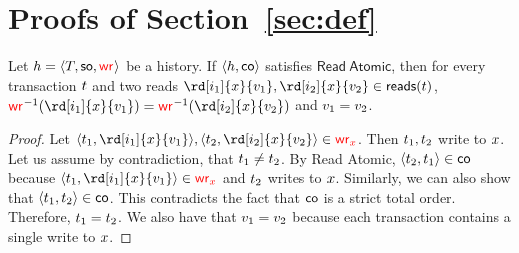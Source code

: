 
\section{Proofs of Section~\ref{sec:def}}\label{app:definitions}

\begin{lemma}
 Let ${h}={\left\langle{T, \mathsf{so}, \textcolor{red}{\mathsf{wr}_{}}}\right\rangle}$ be a history. 
 If ${\left\langle{{h},\mathsf{co}}\right\rangle}$ satisfies $\mathsf{Read\ Atomic}$, then %
 for every transaction ${t}$ and two reads $\rd[\id_1]{\xvar}{\val_1},\rd[\id_2]{\xvar}{\val_2}\in \readOp{\tr}$, $\wro^{-1}(\rd[\id_1]{\xvar}{\val_1})=\wro^{-1}(\rd[\id_2]{\xvar}{\val_2})$ and ${v}_1 = {v}_2$.\end{lemma}
\begin{proof}
 Let $\tup{\tr_1, \rd[\id_1]{\xvar}{\val_1}}, \tup{\tr_2, \rd[\id_2]{\xvar}{\val_2}} \in \wro[\xvar]$. Then ${t}_1, {t}_2$ write to ${x}$. Let us assume by contradiction, that ${t}_1\neq{t}_2$. By \textsf{Read Atomic}, ${\left\langle{{t}_2, {t}_1}\right\rangle} \in \mathsf{co}$ because $\tup{\tr_1, \rd[\id_1]{\xvar}{\val_1}} \in \wro[\xvar]$ and ${t}_2$ writes to ${x}$. Similarly, we can also show that ${\left\langle{{t}_1, {t}_2}\right\rangle} \in \mathsf{co}$. This contradicts the fact that $\mathsf{co}$ is a strict total order. Therefore, ${t}_1 = {t}_2$. We also have that ${v}_1 = {v}_2$ because each transaction contains a single write to ${x}$.
 \end{proof}

